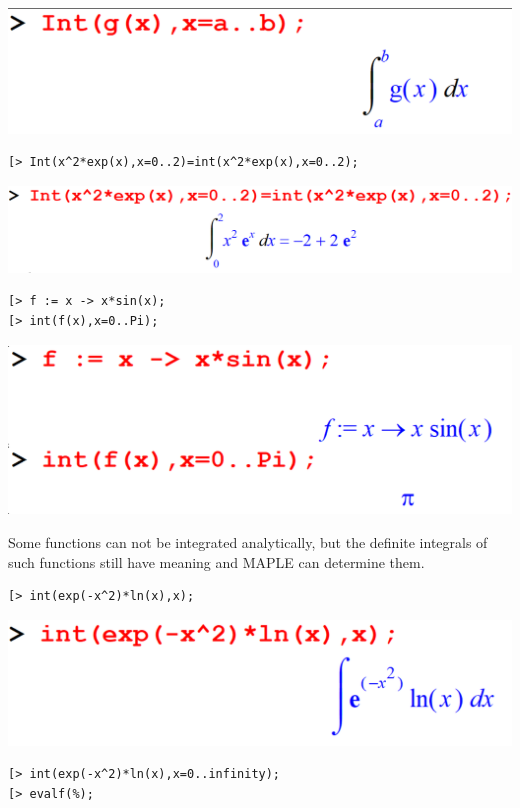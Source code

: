 \documentclass[
]{book}
\theoremstyle{definition}
\theoremstyle{definition}
\theoremstyle{definition}
\theoremstyle{definition}
\theoremstyle{remark}
\begin{document}
\includegraphics{figures/Lesson 6/fig7.png}

\begin{verbatim}
[> Int(x^2*exp(x),x=0..2)=int(x^2*exp(x),x=0..2);
\end{verbatim}

\includegraphics{figures/Lesson 6/fig8.png}

\begin{verbatim}
[> f := x -> x*sin(x);
[> int(f(x),x=0..Pi);
\end{verbatim}

\includegraphics{figures/Lesson 6/fig9.png}

Some functions can not be integrated analytically, but the definite integrals of such functions still have meaning and MAPLE can determine them.

\begin{verbatim}
[> int(exp(-x^2)*ln(x),x);
\end{verbatim}

\includegraphics{figures/Lesson 6/fig10.png}

\begin{verbatim}
[> int(exp(-x^2)*ln(x),x=0..infinity);
[> evalf(%);
\end{verbatim}
\end{document}
